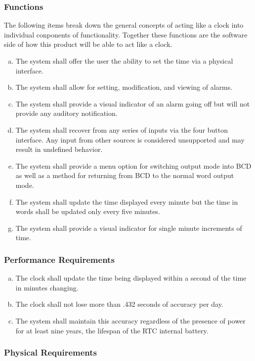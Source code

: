 \documentclass[onecolumn, draftclsnofoot,10pt, compsoc]{IEEEtran}
\begin{document}
\subsubsection{Functions}
The following items break down the general concepts of acting like a clock into individual
conponents of functionality. Together these functions are the software side of
how this product will be able to act like a clock.
\begin{enumerate}[a)]
  \item The system shall offer the user the ability to set the time via a
  physical interface.
  \item
  The system shall allow for setting, modification, and viewing of alarms.
  \item
  The system shall provide a visual indicator of an alarm going off but will not
  provide any auditory notification.
  \item
  The system shall recover from any series of inputs via the four button
  interface. Any input from other sources is considered unsupported and may result
  in undefined behavior.
  \item
  The system shall provide a menu option for switching output mode into BCD as
  well as a method for returning from BCD to the normal word output mode.
  \item
  The system shall update the time displayed every minute but the time in words
  shall be updated only every five minutes.
  \item
  The system shall provide a visual indicator for single minute increments of
  time.
\end{enumerate}

\subsubsection{Performance Requirements}
\begin{enumerate}[a)]
  \item The clock shall update the time being displayed within a second of the
  time in minutes changing.
  \item The clock shall not lose more than .432 seconds of accuracy per day.
  \item The system shall maintain this accuracy regardless of the presence of
  power for at least nine years, the lifespan of the RTC internal battery.
\end{enumerate}

\subsubsection{Physical Requirements}
\end{document}
